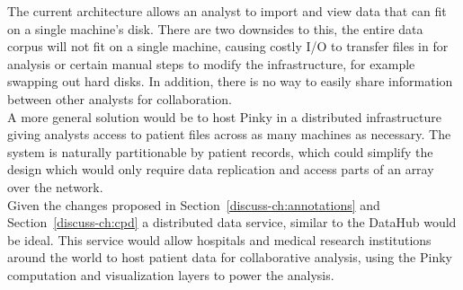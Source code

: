 The current architecture allows an analyst to import and view data that can fit
on a single machine's disk. There are two downsides to this, the entire data
corpus will not fit on a single machine, causing costly I/O to
transfer files in for analysis or certain manual steps to modify the
infrastructure, for example swapping out hard disks. In addition, there is no
way to easily share information between other analysts for collaboration. \\

A more general solution would be to host Pinky in a distributed infrastructure
giving analysts access to patient files across as many machines as necessary.
The system is naturally partitionable by patient records, which could simplify
the design which would only require data replication and access parts of
an array over the network. \\

Given the changes proposed in Section~\ref{discuss-ch:annotations} and
Section~\ref{discuss-ch:cpd} a distributed data service, similar to the
DataHub\cite{datahub} would be ideal.  This service would allow hospitals and
medical research institutions around the world to host patient data for
collaborative analysis, using the Pinky computation and visualization layers to
power the analysis.

